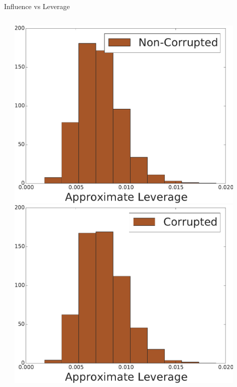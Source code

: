 \documentclass[final,t,english,professionalfonts, xcolor=dvipsnames]{beamer}
\begin{document}
\begin{frame}{}
{\begin{minipage}[c]{0.96\linewidth}
\begin{columns}[t]
\begin{column}{.33\linewidth}
\begin{exampleblock}{Influence vs Leverage}
\begin{columns}
\vspace{-5cm}
\begin{minipage}{\textwidth}
\\
\end{minipage}
\vskip5cm
\begin{minipage}{\textwidth}
\end{minipage}
\includegraphics[width=0.9\textwidth,keepaspectratio=false]{figures/hist_corrupted-n_corruptions-3000_approximate-leverage_non-corrupted-points.pdf}\\
\includegraphics[width=0.9\textwidth,keepaspectratio=false]{figures/hist_corrupted-n_corruptions-3000_approximate-leverage_corrupted-points.pdf}

\end{columns}
\end{exampleblock}
\end{column}
\end{columns}
\end{minipage}}
\end{frame}
\end{document}
